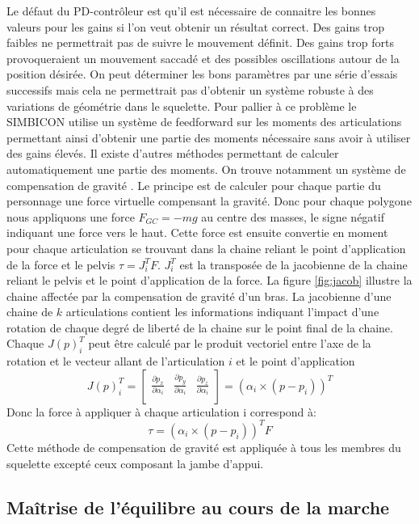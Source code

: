 \documentclass{llncs}
\begin{document}
Le défaut du PD-contrôleur est qu'il est nécessaire de connaitre les bonnes valeurs pour les gains si l'on veut obtenir un résultat correct. Des gains trop faibles ne permettrait pas de suivre le mouvement définit. Des gains trop forts provoqueraient un mouvement saccadé et des possibles oscillations autour de la position désirée. On peut déterminer les bons paramètres par une série d'essais successifs mais cela ne permettrait pas d'obtenir un système robuste à des variations de géométrie dans le squelette. Pour pallier à ce problème le SIMBICON utilise un système de feedforward \cite{yin2007simbicon} sur les moments des articulations permettant ainsi d'obtenir une partie des moments nécessaire sans avoir à utiliser des gains élevés.
Il existe d'autres méthodes permettant de calculer automatiquement une partie des moments. On trouve notamment un système de compensation de gravité \cite{coros2010generalized}. Le principe est de calculer pour chaque partie du personnage une force virtuelle compensant la gravité. Donc pour chaque polygone nous appliquons une force \(F_{GC}=-mg\) au centre des masses, le signe négatif indiquant une force vers le haut. Cette force est ensuite convertie en moment pour chaque articulation se trouvant dans la chaine reliant le point d'application de la force et le pelvis \(\tau=J_i^T F\). \(J_i ^T\) est la transposée de la jacobienne de la chaine reliant le pelvis et le point d'application de la force. La figure \ref{fig:jacob} illustre la chaine affectée par la compensation de gravité d'un bras.
La jacobienne d'une chaine de \(k\) articulations contient les informations indiquant l'impact d'une rotation de chaque degré de liberté de la chaine sur le point final de la chaine. Chaque $J(p)_i ^T$ peut être calculé par le produit vectoriel entre l'axe de la rotation et le vecteur allant de l'articulation \(i\) et le point d'application
\[
J(p)_i ^T =\begin{bmatrix}
\frac{\partial p_x}{\partial \alpha_i} & \frac{\partial p_y}{\partial \alpha_i} & \frac{\partial p_z}{\partial \alpha_i} \\
\end{bmatrix}
= (\alpha_i \times (p-p_i))^T
\]
Donc la force à appliquer à chaque articulation i correspond à:
\[
\tau = (\alpha_i \times (p-p_i))^T F
\]
Cette méthode de compensation de gravité est appliquée à tous les membres du squelette excepté ceux composant la jambe d'appui.


\subsection{Maîtrise de l'équilibre au cours de la marche}
\end{document}
